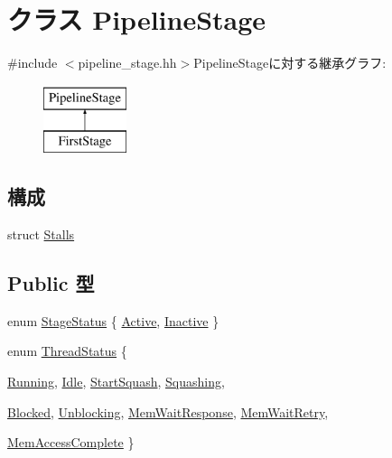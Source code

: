 \hypertarget{classPipelineStage}{
\section{クラス PipelineStage}
\label{classPipelineStage}
}


{\ttfamily \#include $<$pipeline\_\-stage.hh$>$}PipelineStageに対する継承グラフ:\begin{figure}[H]
\begin{center}
\leavevmode
\includegraphics[height=2cm]{classPipelineStage}
\end{center}
\end{figure}
\subsection*{構成}
\begin{DoxyCompactItemize}
\item 
struct \hyperlink{structPipelineStage_1_1Stalls}{Stalls}
\end{DoxyCompactItemize}
\subsection*{Public 型}
\begin{DoxyCompactItemize}
\item 
enum \hyperlink{classPipelineStage_add44b42ba3608b213fc0986c4aee6018}{StageStatus} \{ \hyperlink{classPipelineStage_add44b42ba3608b213fc0986c4aee6018a26bd8444261cc58df7a86753c79d2520}{Active}, 
\hyperlink{classPipelineStage_add44b42ba3608b213fc0986c4aee6018a969c924a722daf6334fca64346092ae6}{Inactive}
 \}
\item 
enum \hyperlink{classPipelineStage_ae2739961013a00cede621d4d72f2173c}{ThreadStatus} \{ \par
\hyperlink{classPipelineStage_ae2739961013a00cede621d4d72f2173ca2f5f2c4a8c4f4f0519d503dcdfbf55cb}{Running}, 
\hyperlink{classPipelineStage_ae2739961013a00cede621d4d72f2173cad3fa9ae9431d6cb1772f9d9df48cab19}{Idle}, 
\hyperlink{classPipelineStage_ae2739961013a00cede621d4d72f2173ca19a48e232b72697e4bb7ea1b6075ed49}{StartSquash}, 
\hyperlink{classPipelineStage_ae2739961013a00cede621d4d72f2173ca22a648855197e326dc88f548634c0ec7}{Squashing}, 
\par
\hyperlink{classPipelineStage_ae2739961013a00cede621d4d72f2173ca9463ee9b8700258a1019b4b9d2d77a30}{Blocked}, 
\hyperlink{classPipelineStage_ae2739961013a00cede621d4d72f2173caf2a3acf850890cb1651bc41dcbacb7e0}{Unblocking}, 
\hyperlink{classPipelineStage_ae2739961013a00cede621d4d72f2173ca84d11a0919e33ccd274f5f0f82006fa6}{MemWaitResponse}, 
\hyperlink{classPipelineStage_ae2739961013a00cede621d4d72f2173caf98795b778c51c0111a0d4982b178200}{MemWaitRetry}, 
\par
\hyperlink{classPipelineStage_ae2739961013a00cede621d4d72f2173ca1883fc473d33feb95a8ea53164e91d0e}{MemAccessComplete}
 \}
\end{DoxyCompactItemize}
